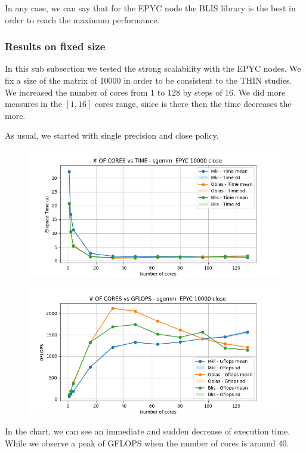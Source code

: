 \documentclass[12pt, titlepage]{report}
\begin{document}
In any case, we can say that for the EPYC node the BLIS library is the best in order to reach the maximum performance. 

\subsubsection{Results on fixed size}
In this sub subsection we tested the strong scalability with the EPYC nodes. We fix a size of the matrix of 10000 in order to be consistent to the THIN studies. We increased the number of cores from 1 to 128 by steps of 16. We did more measures in the $[1,16]$ cores range, since is there then the time decreases the more.  

As usual, we started with single precision and close policy. 
\begin{figure}[H]
    \centering
    \includegraphics[width=\textwidth]{EPYC scalability/sgemm__EPYC_10000_close_time.png}
\end{figure}

\begin{figure}[H]
    \centering
    \includegraphics[width=\textwidth]{EPYC scalability/sgemm__EPYC_10000_close_gflops.png}
\end{figure}
In the chart, we can see an immediate and sudden decrease of execution time. While we observe a peak of GFLOPS when the number of cores is around 40. 
\end{document}

